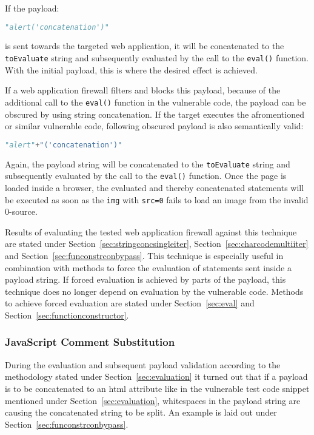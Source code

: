 If the payload:

\begin{lstlisting}[style=basicStyle, language=Python]
"alert('concatenation')"
\end{lstlisting}

is sent towards the targeted web application, it will be concatenated to the \verb|toEvaluate| string and subsequently evaluated by the call to the \verb|eval()| function. With the initial payload, this is where the desired effect is achieved.

If a web application firewall filters and blocks this payload, because of the additional call to the \verb|eval()| function in the vulnerable code, the payload can be obscured by using string concatenation. If the target executes the afromentioned or similar vulnerable code, following obscured payload is also semantically valid:

\begin{lstlisting}[style=basicStyle, language=Python]
"alert"+"('concatenation')"
\end{lstlisting}

Again, the payload string will be concatenated to the \verb|toEvaluate| string and subsequently evaluated by the call to the \verb|eval()| function. Once the page is loaded inside a browser, the evaluated and thereby concatenated statements will be executed as soon as the \verb|img| with \verb|src=0| fails to load an image from the invalid 0-source.

Results of evaluating the tested web application firewall against this technique are stated under Section~\ref{sec:stringconcsingleiter}, Section~\ref{sec:charcodemultiiter} and Section~\ref{sec:funconstrconbypass}. This technique is especially useful in combination with methods to force the evaluation of statements sent inside a payload string. If forced evaluation is achieved by parts of the payload, this technique does no longer depend on evaluation by the vulnerable code. Methods to achieve forced evaluation are stated under Section~\ref{sec:eval} and Section~\ref{sec:functionconstructor}.


\subsubsection{JavaScript Comment Substitution}
\label{sec:jscommentsub}
During the evaluation and subsequent payload validation according to the methodology stated under Section~\ref{sec:evaluation} it turned out that if a payload is to be concatenated to an \acrshort{html} attribute like in the vulnerable test code snippet mentioned under Section~\ref{sec:evaluation}, whitespaces in the payload string are causing the concatenated string to be split. An example is laid out under Section~\ref{sec:funconstrconbypass}.

